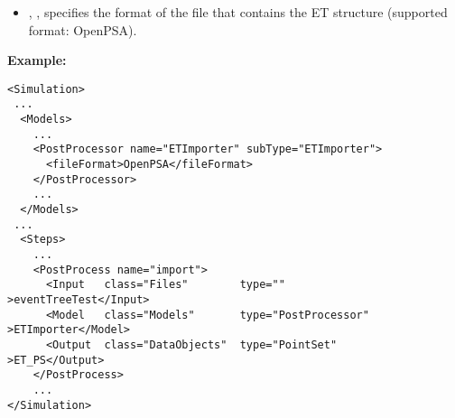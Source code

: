 %
%
\begin{itemize}
  \item {}, , specifies the format of the file that contains the ET structure (supported format: OpenPSA).
\end{itemize}

\textbf{Example:}

\begin{lstlisting}[style=XML]
<Simulation>
 ...
  <Models>
    ...
    <PostProcessor name="ETImporter" subType="ETImporter">
      <fileFormat>OpenPSA</fileFormat>
    </PostProcessor>   
    ...
  </Models>
 ...
  <Steps>
    ...
    <PostProcess name="import">
      <Input   class="Files"        type=""                >eventTreeTest</Input>
      <Model   class="Models"       type="PostProcessor"   >ETImporter</Model>
      <Output  class="DataObjects"  type="PointSet"        >ET_PS</Output>
    </PostProcess>
    ...
</Simulation>
\end{lstlisting}



